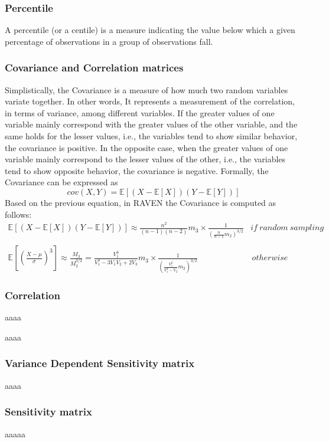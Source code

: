 \subsubsection{Percentile}
A percentile (or a centile) is a measure indicating the value below which a given percentage of observations in a group of observations fall. 

\subsubsection{Covariance and Correlation matrices}
Simplistically, the Covariance is a measure of how much two random variables variate together. In other words, It represents a 
measurement of the correlation, in terms of variance,  among different variables. If the greater values of one variable mainly 
correspond with the greater values of the other variable, and the same holds for the lesser values, i.e., the variables tend to show 
similar behavior, the covariance is positive. In the opposite case, when the greater values of one variable mainly correspond to the 
lesser values of the other, i.e., the variables tend to show opposite behavior, the covariance is negative. 
Formally, the Covariance can be expressed as
\begin{equation}
 cov(X,Y) = \mathbb{E} \left [ \left ( X- \mathbb{E}\left [ X \right ] \right ) \left ( Y- \mathbb{E}\left [ Y \right ] \right )\right ]
\end{equation}
Based on the previous equation, in RAVEN the Covariance is computed as follows:
\begin{equation}
\begin{matrix}
 \mathbb{E} \left [ \left ( X- \mathbb{E}\left [ X \right ] \right ) \left ( Y- \mathbb{E}\left [ Y \right ] \right )\right ]  \approx \displaystyle \frac{n^{2}}{(n-1)(n-2)}m_{3}\times \frac{1}{\left ( \displaystyle \frac{n}{n-1}m_{2}  \right )^{3/2}} & if \: random \: sampling  
\\
\\
\mathbb{E} \left [ \left ( \frac{X-\mu}{\sigma} \right )^{3} \right ]  \approx \frac{M_{3}}{M_{2}^{3/2}}  = \displaystyle \frac{V_{1}^{3}}{V_{1}^{3}-3V_{1}V_{2}+2V_{3}}m_{3} \times \frac{1}{\left ( \displaystyle \frac{V_{1}^{2}}{V_{1}^{2}-V_{2}}m_{2}  \right )^{3/2}} &  \, otherwise
\end{matrix}
\end{equation}



\subsubsection{Correlation}
aaaa

aaaa
\subsubsection{Variance Dependent Sensitivity matrix}

aaaa
\subsubsection{Sensitivity matrix}


aaaaa